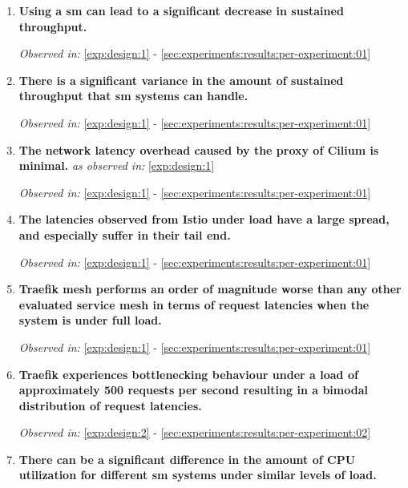 \begin{enumerate}[label=\textbf{MF\arabic*}, leftmargin=3\parindent]
    \item \textbf{Using a \gls{sm} can lead to a significant decrease in sustained throughput.} 
    \label{exp:mf1}
    
    \textit{Observed in:} \ref{exp:design:1} -  \cref{sec:experiments:results:per-experiment:01}
    
    \item \textbf{There is a significant variance in the amount of sustained throughput that \gls{sm} systems can handle.}
    \label{exp:mf2}
    
    \textit{Observed in:} \ref{exp:design:1} -  \cref{sec:experiments:results:per-experiment:01}

    \item \textbf{The network latency overhead caused by the proxy of Cilium is minimal.} \textit{as observed in:} \ref{exp:design:1}
    \label{exp:mf3}
    
    \textit{Observed in:} \ref{exp:design:1} -  \cref{sec:experiments:results:per-experiment:01}
    
    \item \textbf{The latencies observed from Istio under load have a large spread, and especially suffer in their tail end.}
    \label{exp:mf4}
    
    \textit{Observed in:} \ref{exp:design:1} -  \cref{sec:experiments:results:per-experiment:01}
    
    \item \textbf{Traefik mesh performs an order of magnitude worse than any other evaluated service mesh in terms of request latencies when the system is under full load.}
    \label{exp:mf5}
    
    \textit{Observed in:} \ref{exp:design:1} -  \cref{sec:experiments:results:per-experiment:01}
    
    \item \textbf{Traefik experiences bottlenecking behaviour under a load of approximately 500 requests per second resulting in a bimodal distribution of request latencies.}
    \label{exp:mf6}
    
    \textit{Observed in:} \ref{exp:design:2} -  \cref{sec:experiments:results:per-experiment:02}
    
    \item \textbf{There can be a significant difference in the amount of CPU utilization for different \gls{sm} systems under similar levels of load.}
    \label{exp:mf7}
    

\end{enumerate}
